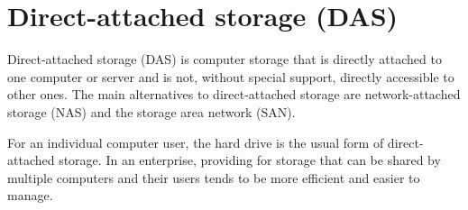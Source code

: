 \newpage
\section{Direct-attached storage (DAS) }


Direct-attached storage (DAS) is computer storage that is directly attached to one computer or server and is not, without special support, directly accessible to other ones. The main alternatives to direct-attached storage are network-attached storage (NAS) and the storage area network (SAN).


For an individual computer user, the hard drive is the usual form of direct-attached storage. In an enterprise, providing for storage that can be shared by multiple computers and their users tends to be more efficient and easier to manage.
